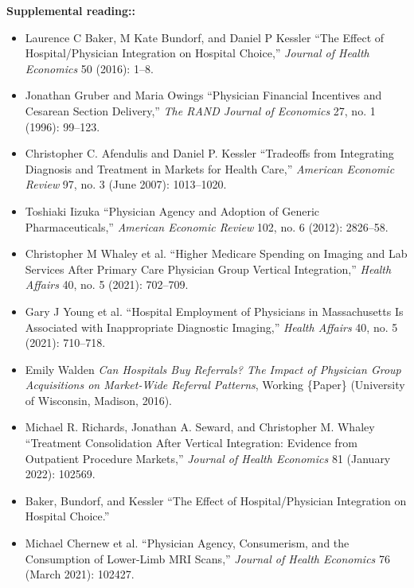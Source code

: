 \documentclass[11pt,]{article}
\providecommand{\tightlist}{%
  \setlength{\itemsep}{0pt}\setlength{\parskip}{0pt}}
\begin{document}
\textbf{Supplemental reading::}

\begin{itemize}
\tightlist
\item
  Laurence C Baker, M Kate Bundorf, and Daniel P Kessler {``The {Effect}
  of {Hospital}/{Physician} {Integration} on {Hospital} {Choice},''}
  \emph{Journal of Health Economics} 50 (2016): 1--8.
\item
  Jonathan Gruber and Maria Owings {``Physician Financial Incentives and
  Cesarean Section Delivery,''} \emph{The RAND Journal of Economics} 27,
  no. 1 (1996): 99--123.
\item
  Christopher C. Afendulis and Daniel P. Kessler {``Tradeoffs from
  {Integrating} {Diagnosis} and {Treatment} in {Markets} for {Health}
  {Care},''} \emph{American Economic Review} 97, no. 3 (June 2007):
  1013--1020.
\item
  Toshiaki Iizuka {``Physician Agency and Adoption of Generic
  Pharmaceuticals,''} \emph{American Economic Review} 102, no. 6 (2012):
  2826--58.
\item
  Christopher M Whaley et al. {``Higher {Medicare} {Spending} on
  {Imaging} and {Lab} {Services} After {Primary} {Care} {Physician}
  {Group} {Vertical} {Integration},''} \emph{Health Affairs} 40, no. 5
  (2021): 702--709.
\item
  Gary J Young et al. {``Hospital {Employment} of {Physicians} in
  {Massachusetts} {Is} {Associated} with {Inappropriate} {Diagnostic}
  {Imaging},''} \emph{Health Affairs} 40, no. 5 (2021): 710--718.
\item
  Emily Walden \emph{Can {Hospitals} {Buy} {Referrals}? {The} {Impact}
  of {Physician} {Group} {Acquisitions} on {Market}-{Wide} {Referral}
  {Patterns}}, Working \{Paper\} (University of Wisconsin, Madison,
  2016).
\item
  Michael R. Richards, Jonathan A. Seward, and Christopher M. Whaley
  {``Treatment Consolidation After Vertical Integration: {Evidence} from
  Outpatient Procedure Markets,''} \emph{Journal of Health Economics} 81
  (January 2022): 102569.
\item
  Baker, Bundorf, and Kessler {``The {Effect} of {Hospital}/{Physician}
  {Integration} on {Hospital} {Choice}.''}
\item
  Michael Chernew et al. {``Physician Agency, Consumerism, and the
  Consumption of Lower-Limb {MRI} Scans,''} \emph{Journal of Health
  Economics} 76 (March 2021): 102427.
\end{itemize}
\end{document}
